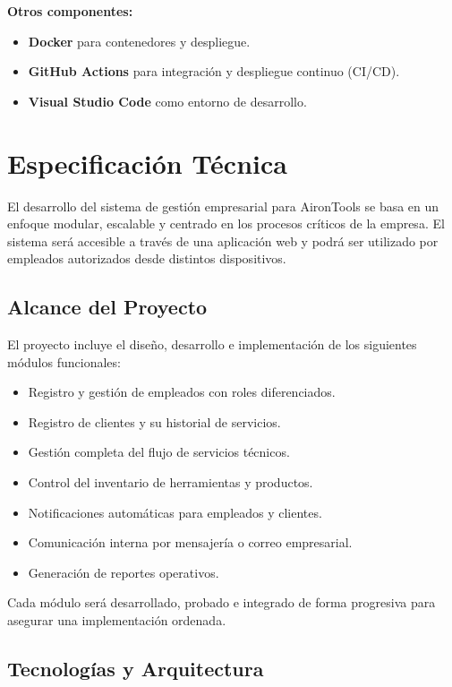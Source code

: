 \textbf{Otros componentes:}
\begin{itemize}
	\item \textbf{Docker} para contenedores y despliegue.
	\item \textbf{GitHub Actions} para integración y despliegue continuo (CI/CD).
	\item \textbf{Visual Studio Code} como entorno de desarrollo.
\end{itemize}








\section{Especificación Técnica}

El desarrollo del sistema de gestión empresarial para AironTools se basa en un enfoque modular, escalable y centrado en los procesos críticos de la empresa. El sistema será accesible a través de una aplicación web y podrá ser utilizado por empleados autorizados desde distintos dispositivos.

\subsection{Alcance del Proyecto}

El proyecto incluye el diseño, desarrollo e implementación de los siguientes módulos funcionales:

\begin{itemize}
	\item Registro y gestión de empleados con roles diferenciados.
	\item Registro de clientes y su historial de servicios.
	\item Gestión completa del flujo de servicios técnicos.
	\item Control del inventario de herramientas y productos.
	\item Notificaciones automáticas para empleados y clientes.
	\item Comunicación interna por mensajería o correo empresarial.
	\item Generación de reportes operativos.
\end{itemize}

Cada módulo será desarrollado, probado e integrado de forma progresiva para asegurar una implementación ordenada.

\subsection{Tecnologías y Arquitectura}

